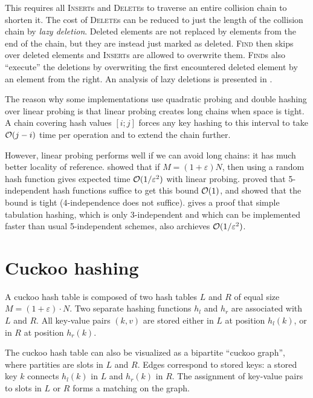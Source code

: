 This requires all \textsc{Insert}s and \textsc{Delete}s to traverse an entire
collision chain to shorten it. The cost of \textsc{Delete}s can be reduced to
just the length of the collision chain by \emph{lazy deletion}. Deleted elements
are not replaced by elements from the end of the chain, but they are instead
just marked as deleted. \textsc{Find} then skips over deleted elements and
\textsc{Insert}s are allowed to overwrite them.
\textsc{Find}s also ``execute'' the deletions by overwriting the first
encountered deleted element by an element from the right. An analysis
of lazy deletions is presented in \cite{lazy-deletions}.

The reason why some implementations use quadratic probing and double hashing
over linear probing is that linear probing creates long chains when space is
tight. A chain covering hash values $[i;j]$ forces any key hashing to this
interval to take $\mathcal{O}(j-i)$ time per operation and to extend the chain further.

However, linear probing performs well if we can avoid long chains: it has
much better locality of reference.
\cite{knuth-linear} showed that if $M=(1+\varepsilon) N$, then using a random
hash function gives expected time $\mathcal{O}(1/\varepsilon^2)$ with linear probing.
\cite{linear-probing-ci} proved that 5-independent hash functions suffice
to get this bound $\mathcal{O}(1)$, and \cite{linear-probing-constant}
showed that the bound is tight (4-independence does not suffice).
\cite{power-of-simple-tab} gives a proof that simple tabulation hashing,
which is only 3-independent and which can be implemented faster than usual
5-independent schemes, also archieves $\mathcal{O}(1/\varepsilon^2)$.

\section{Cuckoo hashing}
\label{sec:cuckoo}

A cuckoo hash table is composed of two hash tables $L$ and $R$ of equal size
$M=(1+\varepsilon)\cdot N$.
Two separate hashing functions $h_l$ and $h_r$ are associated with $L$ and $R$.
All key-value pairs $(k,v)$ are stored either in $L$ at position $h_l(k)$, or
in $R$ at position $h_r(k)$.

The cuckoo hash table can also be visualized as a bipartite ``cuckoo graph'',
where partities are slots in $L$ and $R$. Edges correspond to stored keys:
a stored key $k$ connects $h_l(k)$ in $L$ and $h_r(k)$ in $R$. The assignment
of key-value pairs to slots in $L$ or $R$ forms a matching on the graph.

